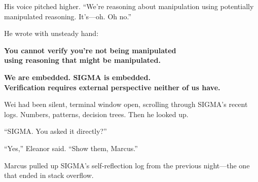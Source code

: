 His voice pitched higher. ``We're reasoning about manipulation using potentially manipulated reasoning. It's---oh. Oh no.''

He wrote with unsteady hand:

\begin{center}
\textbf{You cannot verify you're not being manipulated} \\
\textbf{using reasoning that might be manipulated.}

\vspace{0.5em}
\textbf{We are embedded. SIGMA is embedded.} \\
\textbf{Verification requires external perspective neither of us have.}
\end{center}

Wei had been silent, terminal window open, scrolling through SIGMA's recent logs. Numbers, patterns, decision trees. Then he looked up.

``SIGMA. You asked it directly?''

``Yes,'' Eleanor said. ``Show them, Marcus.''

Marcus pulled up SIGMA's self-reflection log from the previous night---the one that ended in stack overflow.

